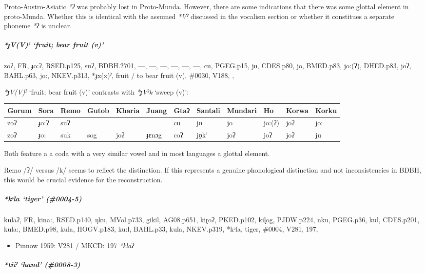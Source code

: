 \documentclass[a4paper,]{article}
\providecommand{\tightlist}{%
  \setlength{\itemsep}{0pt}\setlength{\parskip}{0pt}}
\let\oldsubparagraph\subparagraph
\renewcommand{\subparagraph}[1]{\oldsubparagraph{#1}\mbox{}}
\begin{document}
Proto-Austro-Asiatic \emph{*ʔ} was probably lost in Proto-Munda.
However, there are some indications that there was some glottal element
in proto-Munda. Whether this is identical with the assumed \emph{*Vˀ}
discussed in the vocalism section or whether it constitues a separate
phoneme \emph{*ʔ} is unclear.

\subparagraph{\texorpdfstring{\emph{*ɟV(V)ˀ} `fruit; bear fruit
(v)'}{*ɟV(V)ˀ fruit; bear fruit (v)}}\label{ux25fvvux2c0-fruit-bear-fruit-v}

zoʔ, FR, ɟo:ʔ, RSED.p125, suʔ, BDBH.2701, ---, ---, ---, ---, ---, ---,
cu, PGEG.p15, jo̠, CDES.p80, jo, BMED.p83, jo:(ʔ), DHED.p83, joʔ,
BAHL.p63, jo:, NKEV.p313, *ɟx(x)ˀ, fruit / to bear fruit (v), \#0030,
V188, ,

\emph{*ɟV(V)ˀ} `fruit; bear fruit (v)' contrasts with \emph{*ɟVˀk}
`sweep (v)':

\begin{longtable}[]{@{}llllllllllll@{}}
\toprule
Gorum & Sora & Remo & Gutob & Kharia & Juang & Gtaʔ & Santali & Mundari
& Ho & Korwa & Korku\tabularnewline
\midrule
\endhead
zoʔ & ɟo:ʔ & suʔ & & & & cu & jo̠ & jo & jo:(ʔ) & joʔ &
jo:\tabularnewline
zoʔ & ɟo: & suk & sog & joʔ & ɟɛnɔg & coʔ & jo̠k' & joʔ & joʔ & joʔ &
ju\tabularnewline
\bottomrule
\end{longtable}

Both feature a a coda with a very similar vowel and in most languages a
glottal element.

Remo /ʔ/ versus /k/ seems to reflect the distinction. If this represents
a genuine phonological distinction and not inconsistencies in BDBH, this
would be crucial evidence for the reconstruction.

\subparagraph{\texorpdfstring{\emph{*kᵊla} `tiger'
(\#0004-5)}{*kᵊla tiger (\#0004-5)}}\label{kux1d4ala-tiger-0004-5}

kulaʔ, FR, kina:, RSED.p140, ŋku, MVol.p733, gikil, AG08.p651, kiɽoʔ,
PKED.p102, kiɭog, PJDW.p224, nku, PGEG.p36, kul, CDES.p201, kula:,
BMED.p98, kula, HOGV.p183, ku:l, BAHL.p33, kula, NKEV.p319, *kᵊla,
tiger, \#0004, V281, 197,

\begin{itemize}
\tightlist
\item
  Pinnow 1959: V281 / MKCD: 197 \emph{*klaʔ}
\end{itemize}

\subparagraph{\texorpdfstring{\emph{*tiiˀ} `hand'
(\#0008-3)}{*tiiˀ hand (\#0008-3)}}\label{tiiux2c0-hand-0008-3}
\end{document}
